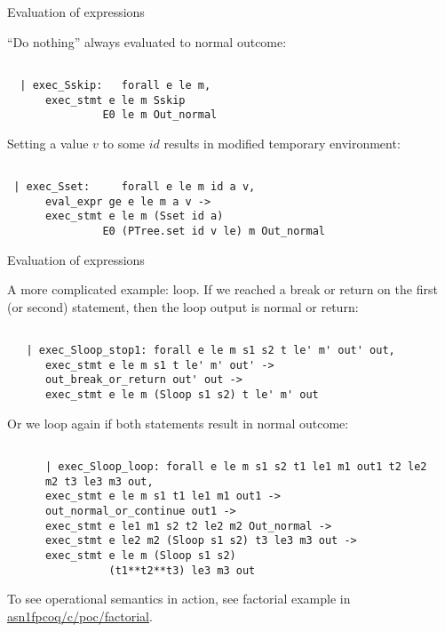 \documentclass{beamer}
\begin{document}
\begin{frame}[fragile]{Evaluation of expressions}

  ``Do nothing'' always evaluated to normal outcome: 

  \begin{lstlisting}[language=Coq]
   
  | exec_Sskip:   forall e le m,
      exec_stmt e le m Sskip
               E0 le m Out_normal
\end{lstlisting}

Setting a value $v$ to some $id$ results in modified temporary environment:
  
    \begin{lstlisting}[language=Coq]
   
 | exec_Sset:     forall e le m id a v,
      eval_expr ge e le m a v ->
      exec_stmt e le m (Sset id a)
               E0 (PTree.set id v le) m Out_normal
\end{lstlisting}
\end{frame}

\begin{frame}[fragile]{Evaluation of expressions}

  A more complicated example: loop. If we reached a break or return on the first (or second) statement, then the loop output is normal or return:
  
  \begin{lstlisting}[language=Coq]
   
   | exec_Sloop_stop1: forall e le m s1 s2 t le' m' out' out,
      exec_stmt e le m s1 t le' m' out' ->
      out_break_or_return out' out ->
      exec_stmt e le m (Sloop s1 s2) t le' m' out
\end{lstlisting}

Or we loop again if both statements result in normal outcome:
  
    \begin{lstlisting}[language=Coq]
   
      | exec_Sloop_loop: forall e le m s1 s2 t1 le1 m1 out1 t2 le2
      m2 t3 le3 m3 out,
      exec_stmt e le m s1 t1 le1 m1 out1 ->
      out_normal_or_continue out1 ->
      exec_stmt e le1 m1 s2 t2 le2 m2 Out_normal ->
      exec_stmt e le2 m2 (Sloop s1 s2) t3 le3 m3 out ->
      exec_stmt e le m (Sloop s1 s2)
                (t1**t2**t3) le3 m3 out
\end{lstlisting}
\end{frame}

\begin{frame} To see operational semantics in action, see factorial example in \url{asn1fpcoq/c/poc/factorial}.
  \end{frame}
\end{document}

